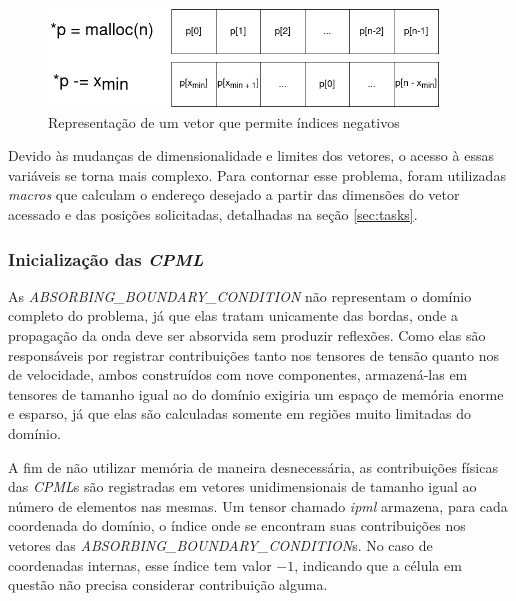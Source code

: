 \documentclass[cic,tc]{iiufrgs}
\begin{document}
\begin{figure}[!htb]
    \caption{Representação de um vetor que permite índices negativos}
    \begin{center}
      \includegraphics[width=28em]{negative_index}
    \end{center}
    \label{fig:negative_index}
\end{figure}

Devido às mudanças de dimensionalidade e limites dos vetores, o acesso à essas variáveis se torna mais complexo. Para contornar esse problema, foram utilizadas \textit{macros} que calculam
o endereço desejado a partir das dimensões do vetor acessado e das posições solicitadas, detalhadas na seção \ref{sec:tasks}.

\subsubsection{Inicialização das \textit{CPML}}

As \textit{ABSORBING\_BOUNDARY\_CONDITION} não representam o domínio completo do
problema, já que elas tratam unicamente das bordas, onde a propagação da onda deve ser absorvida sem produzir reflexões. Como elas são
responsáveis por registrar contribuições tanto nos tensores de tensão quanto nos de velocidade, ambos construídos com nove componentes,
armazená-las em tensores de tamanho igual ao do domínio exigiria um espaço de memória enorme e esparso, já que elas são calculadas somente
em regiões muito limitadas do domínio.

A fim de não utilizar memória de maneira desnecessária, as contribuições físicas das \textit{CPML}s são registradas em vetores
unidimensionais de tamanho igual ao número de elementos nas mesmas. Um tensor chamado \textit{ipml} armazena, para cada coordenada
do domínio, o índice onde se encontram suas contribuições nos vetores das \textit{ABSORBING\_BOUNDARY\_CONDITION}s. No caso de coordenadas
internas, esse índice tem valor $-1$, indicando que a célula em questão não precisa considerar contribuição alguma. 
\end{document}
